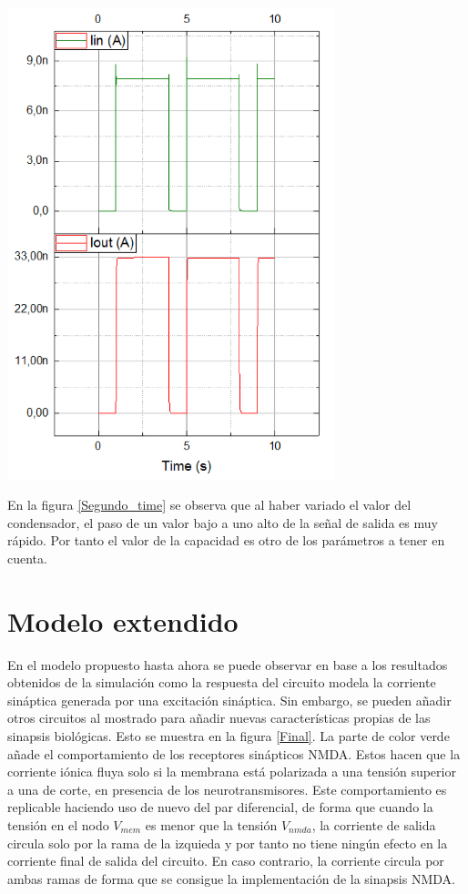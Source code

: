 	\begin{center}
		\includegraphics[width=9.5cm]{Imagenes/Sinaptico/Segundo_time}
    		\label{Segundo_time}
	\end{center}	
	
	En la figura \ref{Segundo_time} se observa que al haber variado el valor del condensador, el paso de un valor bajo a uno alto de la señal de salida es muy rápido. Por tanto el valor de la capacidad es otro de los parámetros a tener en cuenta.

\section{Modelo extendido}

En el modelo propuesto hasta ahora se puede observar en base a los resultados obtenidos de la simulación como la respuesta del circuito modela la corriente sináptica generada por una excitación sináptica. Sin embargo, se pueden añadir otros circuitos al mostrado para añadir nuevas características propias de las sinapsis biológicas. Esto se muestra en la figura \ref{Final}. La parte de color verde añade el comportamiento de los receptores sinápticos NMDA. Estos hacen que la corriente iónica fluya solo si la membrana está polarizada a una tensión superior a una de corte, en presencia de los neurotransmisores. Este comportamiento es replicable haciendo uso de nuevo del par diferencial, de forma que cuando la tensión en el nodo $V_{mem}$ es menor que la tensión $V_{nmda}$, la corriente de salida circula solo por la rama de la izquieda y por tanto no tiene ningún efecto en la corriente final de salida del circuito. En caso contrario, la corriente circula por ambas ramas de forma que se consigue la implementación de la sinapsis NMDA. 


